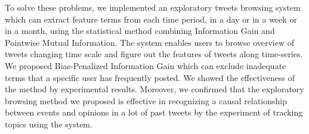 To solve these problems, we implemented an exploratory tweets browsing system which can extract feature terms from each time period, in a day or in a week or in a month,  using the statistical method combining Information Gain and Pointwise Mutual Information.
The system enables users to browse overview of tweets changing time scale and figure out the features of tweets along time-series.
We proposed Bias-Penalized Information Gain which can exclude inadequate terms that a specific user has frequently posted. We showed the effectiveness of the method by experimental results.
Moreover, we confirmed that the exploratory browsing method we proposed is effective in recognizing a causal relationship between events and  opinions in a lot of past tweets by the experiment of tracking topics using the system.

